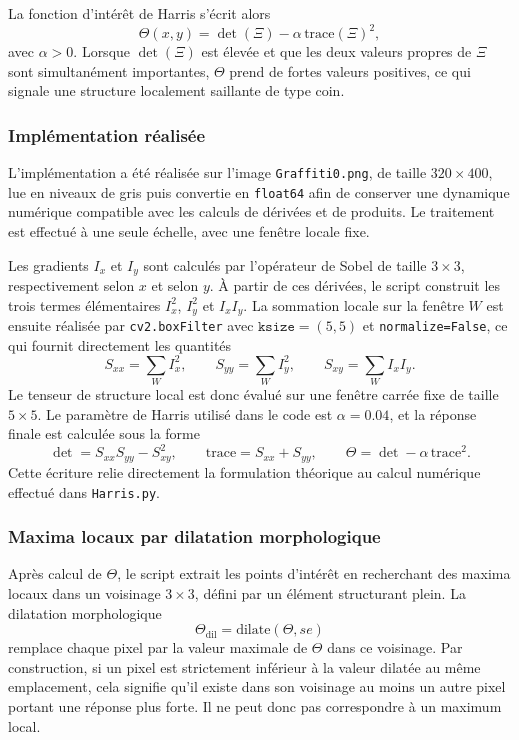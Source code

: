\documentclass[11pt,a4paper]{article}
\begin{document}
La fonction d'intérêt de Harris s'écrit alors
\[
\Theta(x,y)=\det(\Xi)-\alpha\,\mathrm{trace}(\Xi)^2,
\]
avec \(\alpha > 0\). Lorsque \(\det(\Xi)\) est élevée et que les deux valeurs propres de \(\Xi\) sont simultanément importantes, \(\Theta\) prend de fortes valeurs positives, ce qui signale une structure localement saillante de type coin.

\subsubsection{Implémentation réalisée}
L'implémentation a été réalisée sur l'image \texttt{Graffiti0.png}, de taille \(320 \times 400\), lue en niveaux de gris puis convertie en \texttt{float64} afin de conserver une dynamique numérique compatible avec les calculs de dérivées et de produits. Le traitement est effectué à une seule échelle, avec une fenêtre locale fixe.

Les gradients \(I_x\) et \(I_y\) sont calculés par l'opérateur de Sobel de taille \(3 \times 3\), respectivement selon \(x\) et selon \(y\). À partir de ces dérivées, le script construit les trois termes élémentaires \(I_x^2\), \(I_y^2\) et \(I_x I_y\). La sommation locale sur la fenêtre \(W\) est ensuite réalisée par \texttt{cv2.boxFilter} avec \(\texttt{ksize}=(5,5)\) et \texttt{normalize=False}, ce qui fournit directement les quantités
\[
S_{xx}=\sum_W I_x^2,\qquad
S_{yy}=\sum_W I_y^2,\qquad
S_{xy}=\sum_W I_x I_y.
\]
Le tenseur de structure local est donc évalué sur une fenêtre carrée fixe de taille \(5 \times 5\). Le paramètre de Harris utilisé dans le code est \(\alpha = 0.04\), et la réponse finale est calculée sous la forme
\[
\det = S_{xx}S_{yy}-S_{xy}^2,\qquad
\mathrm{trace}=S_{xx}+S_{yy},\qquad
\Theta=\det-\alpha\,\mathrm{trace}^2.
\]
Cette écriture relie directement la formulation théorique au calcul numérique effectué dans \texttt{Harris.py}.

\subsubsection{Maxima locaux par dilatation morphologique}
Après calcul de \(\Theta\), le script extrait les points d'intérêt en recherchant des maxima locaux dans un voisinage \(3 \times 3\), défini par un élément structurant plein. La dilatation morphologique
\[
\Theta_{\mathrm{dil}} = \mathrm{dilate}(\Theta, se)
\]
remplace chaque pixel par la valeur maximale de \(\Theta\) dans ce voisinage. Par construction, si un pixel est strictement inférieur à la valeur dilatée au même emplacement, cela signifie qu'il existe dans son voisinage au moins un autre pixel portant une réponse plus forte. Il ne peut donc pas correspondre à un maximum local.
\end{document}

